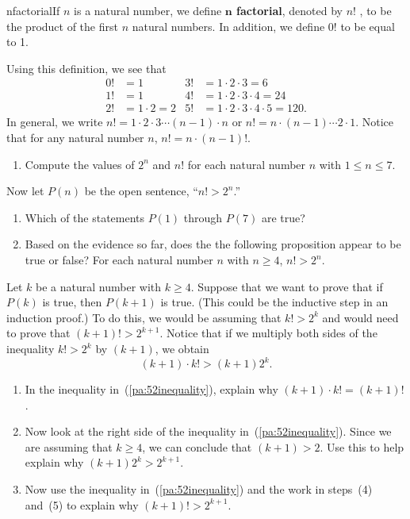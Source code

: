 \begin{previewactivity} \label{PA:factorials} \hfill

\begin{defbox}{nfactorial}{If  $n$  is a natural number, we define \textbf{$\boldsymbol{n}$  factorial},
%
 denoted by $n!$ \label{sym:factorial},  to be the product of the first  $n$  natural numbers.  In addition, we define  $0!$ to be equal to  1.}
\end{defbox} 
Using this definition, we see that
\begin{align*}
0! &= 1  &  3! &= 1 \cdot 2 \cdot 3 = 6 \\
1! &=1   &  4! &= 1 \cdot 2 \cdot 3 \cdot 4 = 24\\
2! &= 1 \cdot 2 = 2  &  5! &= 1 \cdot 2 \cdot 3 \cdot 4 \cdot 5 = 120.
\end{align*}
%
\noindent
In general, we write  $n! = 1 \cdot 2 \cdot 3   \cdots \left( {n - 1} \right) \cdot n$ or  $n! = n \cdot \left( {n - 1} \right)  \cdots 2 \cdot 1$.  Notice that  for any natural number $n$, $n! = n \cdot (n-1)!$.
%
\begin{enumerate}
\item Compute the values of $2^n$ and $n!$ for each natural number  $n$  with  $1 \leq n \leq 7$. 
\label{pa:5211}
\end{enumerate}
Now let $P(n)$ be the open sentence, ``$n! > 2^n$.''
\setcounter{oldenumi}{\theenumi}
\begin{enumerate} \setcounter{enumi}{\theoldenumi}
  \item Which of the statements $P(1)$ through $P(7)$ are true?
\item Based on the evidence so far, does the the following proposition appear to be true or false? \label{pa:5212}
For each natural number  $n$ with $n \geq 4$,
$n! > 2^n $.
\end{enumerate}
\setcounter{equation}{0}
Let $k$ be a natural number with $k \geq 4$.  Suppose that we want to prove that if $P(k)$ is true, then $P(k+1)$ is true.  (This could be the inductive step in an induction proof.)  To do this, we would be assuming that $k! > 2^k$ and would need to prove that $(k+1)! > 2^{k+1}$.  Notice that if we multiply both sides of the inequality $k! > 2^k$ by $(k + 1)$, we obtain
\begin{equation} \label{pa:52inequality}
(k + 1)\cdot k! > (k + 1) 2^k. 
\end{equation}
\setcounter{oldenumi}{\theenumi}
\begin{enumerate} \setcounter{enumi}{\theoldenumi}
\item In the inequality in~(\ref{pa:52inequality}), explain why $(k + 1) \cdot k! = (k + 1)!$.
\item Now look at the right side of the inequality in~(\ref{pa:52inequality}).  Since we are assuming that $k \geq 4$, we can conclude that $(k+1) > 2$.  Use this to help explain why $(k + 1)2^k > 2^{k+1}$.
\item Now use the inequality in~(\ref{pa:52inequality}) and the work in steps~(4) and~(5) to explain why 
$(k+1)! > 2^{k+1}$.
\end{enumerate}


\end{previewactivity}
